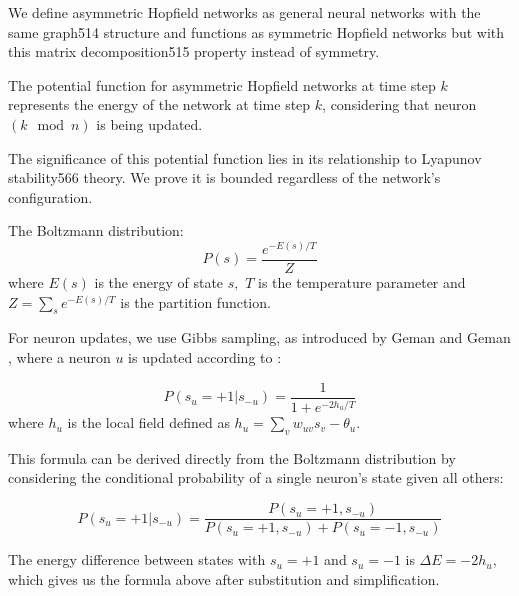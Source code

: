 \begin{definition}\label{Asymmetric HopfieldNetwork}
\leanok  
We define asymmetric Hopfield networks as general neural networks with the same graph514
structure and functions as symmetric Hopfield networks but with this matrix decomposition515
property instead of symmetry.
\end{definition}

\begin{definition}\label{PotentialFunction}
The potential function for asymmetric Hopfield networks at time step $k$
represents the energy of the network at time step $k$, considering that neuron $(k \mod n)$ is being updated.
\leanok
\end{definition}

\begin{lemma}\label{Potential function is bounded}
\leanok
The significance of this potential function lies in its relationship to Lyapunov stability566
theory. We prove it is bounded regardless of the network’s configuration.
\end{lemma}

\begin{definition}\label{boltzmannDistribution}
\leanok
The Boltzmann distribution:
$$P(s) = \frac{e^{-E(s)/T}}{Z}$$
where $E(s)$ is the energy of state $s,$ $T$ is the temperature parameter and 
$Z = \sum_{s} e^{-E(s)/T}$ is the partition function.
\end{definition}


\begin{definition}\label{GibbsSampling}
\leanok
For neuron updates, we use Gibbs sampling, as introduced by Geman and Geman 
\cite{geman}, where a neuron $u$ is updated according to :

$$P(s_u = +1 | s_{-u}) = \frac{1}{1 + e^{-2h_u/T}}$$
where $h_u$ is the local field defined as $h_u = \sum_v w_{uv}s_v - \theta_u$. 

This formula can be derived directly from the Boltzmann distribution by 
considering the conditional probability of a single neuron's state given all others:

$$P(s_u = +1 | s_{-u}) = \frac{P(s_u = +1, s_{-u})}{P(s_u = +1, s_{-u}) + P(s_u = -1, s_{-u})}$$

The energy difference between states with $s_u = +1$ and $s_u = -1$ 
is $\Delta E = -2h_u$, which gives us the formula above after substitution and simplification.
\end{definition}

